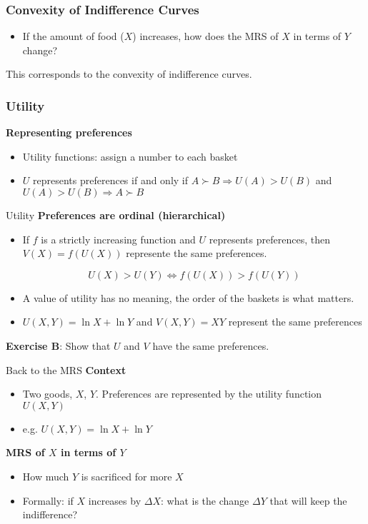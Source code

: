 \documentclass[handout]{beamer}
\begin{document}
\begin{frame}\frametitle{Convexity of Indifference Curves}
\begin{itemize}
\item If the amount of food ($X$) increases, how does the MRS of $X$ in terms of $Y$ change?
\end{itemize}

This corresponds to the convexity of indifference curves. 
\end{frame}

\begin{frame}\frametitle{Utility}

\textbf{Representing preferences}
\begin{itemize}
\item  Utility functions: assign a number to each basket
\item $U$ represents preferences if and only if $ A \succ B \Rightarrow U(A) > U(B)$ and 
$ U(A) > U(B)   \Rightarrow A \succ B$
\end{itemize}
\vfill
\end{frame}

\begin{frame}{Utility}
\textbf{Preferences are ordinal (hierarchical)}
\begin{itemize}
\item If $f$ is a strictly increasing function and $U$ represents preferences, then $V(X) = f(U(X))$ represente the same preferences.

$$ U(X) > U(Y) \iff f(U(X)) > f(U(Y))$$
\item A value of utility has no meaning, the order of the baskets is what matters.
\item $U(X,Y) = \ln X + \ln Y$ and $V(X,Y) = XY$ represent the same preferences
\end{itemize}
\textbf{Exercise B}: Show that $U$ and $V$ have the same preferences. 
\end{frame}


\begin{frame}{Back to the MRS}
\textbf{Context}
\begin{itemize}
\item Two goods, $X$, $Y$.  Preferences are represented by the utility function $U(X,Y)$
\item e.g. $U(X,Y) = \ln X + \ln Y$
\end{itemize}
\textbf{MRS of $X$ in terms of $Y$} \pause
\begin{itemize}
\item How much $Y$ is sacrificed for more $X$\pause
\item Formally: if $X$ increases by $\Delta X$: what is the change $\Delta Y $ that will keep the indifference?
\end{itemize}
\end{frame}
\end{document}
